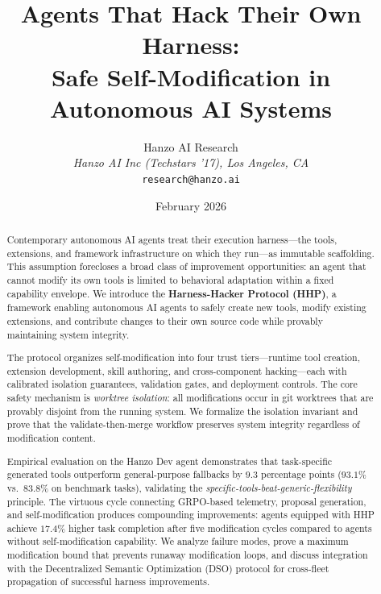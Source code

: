 \documentclass[11pt]{article}
\title{Agents That Hack Their Own Harness:\\Safe Self-Modification in Autonomous AI Systems}
\author{
    Hanzo AI Research\\
    \textit{Hanzo AI Inc (Techstars '17), Los Angeles, CA}\\
    \texttt{research@hanzo.ai}
}
\date{February 2026}
\begin{document}
\maketitle
\luxcoverpage

\begin{abstract}
Contemporary autonomous AI agents treat their execution harness---the tools,
extensions, and framework infrastructure on which they run---as immutable
scaffolding. This assumption forecloses a broad class of improvement
opportunities: an agent that cannot modify its own tools is limited to
behavioral adaptation within a fixed capability envelope. We introduce the
\textbf{Harness-Hacker Protocol (HHP)}, a framework enabling autonomous AI
agents to safely create new tools, modify existing extensions, and contribute
changes to their own source code while provably maintaining system integrity.

The protocol organizes self-modification into four trust tiers---runtime tool
creation, extension development, skill authoring, and cross-component
hacking---each with calibrated isolation guarantees, validation gates, and
deployment controls. The core safety mechanism is \emph{worktree isolation}: all
modifications occur in git worktrees that are provably disjoint from the running
system. We formalize the isolation invariant and prove that the
validate-then-merge workflow preserves system integrity regardless of
modification content.

Empirical evaluation on the Hanzo Dev agent demonstrates that task-specific
generated tools outperform general-purpose fallbacks by $\mathbf{9.3}$
percentage points ($93.1\%$ vs.\ $83.8\%$ on benchmark tasks), validating the
\emph{specific-tools-beat-generic-flexibility} principle. The virtuous cycle
connecting GRPO-based telemetry, proposal generation, and self-modification
produces compounding improvements: agents equipped with HHP achieve $\mathbf{17.4\%}$
higher task completion after five modification cycles compared to agents without
self-modification capability. We analyze failure modes, prove a maximum
modification bound that prevents runaway modification loops, and discuss
integration with the Decentralized Semantic Optimization (DSO) protocol for
cross-fleet propagation of successful harness improvements.
\end{abstract}

\end{document}

